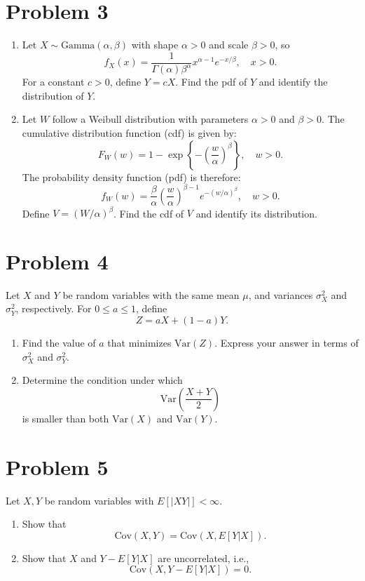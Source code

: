 \documentclass{article}
\begin{document}
\section*{Problem 3}
\begin{enumerate}
    \item Let $X \sim \text{Gamma}(\alpha, \beta)$ with shape $\alpha > 0$ and scale $\beta > 0$, so
    \[
    f_X(x) = \frac{1}{\Gamma(\alpha)\beta^{\alpha}} x^{\alpha-1} e^{-x/\beta}, \quad x > 0.
    \]
    For a constant $c > 0$, define $Y = cX$. Find the pdf of $Y$ and identify the distribution of $Y$.

    \item Let $W$ follow a Weibull distribution with parameters $\alpha > 0$ and $\beta > 0$.
    The cumulative distribution function (cdf) is given by:
    \[
    F_W(w) = 1 - \exp\left\{-\left(\frac{w}{\alpha}\right)^\beta\right\}, \quad w > 0.
    \]
    The probability density function (pdf) is therefore:
    \[
    f_W(w) = \frac{\beta}{\alpha} \left( \frac{w}{\alpha} \right)^{\beta-1} e^{-(w/\alpha)^\beta}, \quad w > 0.
    \]
    Define $V = (W/\alpha)^\beta$. Find the cdf of $V$ and identify its distribution.
\end{enumerate}

\section*{Problem 4}
Let $X$ and $Y$ be random variables with the same mean $\mu$, and variances $\sigma_X^2$ and $\sigma_Y^2$, respectively. For $0 \le a \le 1$, define
\[
Z = aX + (1-a)Y.
\]

\begin{enumerate}
    \item Find the value of $a$ that minimizes $\text{Var}(Z)$. Express your answer in terms of $\sigma_X^2$ and $\sigma_Y^2$.
    \item Determine the condition under which
    \[
    \text{Var}\left(\frac{X+Y}{2}\right)
    \]
    is smaller than both $\text{Var}(X)$ and $\text{Var}(Y)$.
\end{enumerate}

\section*{Problem 5}
Let $X, Y$ be random variables with $E[|XY|] < \infty$.

\begin{enumerate}
    \item Show that
    \[
    \text{Cov}(X, Y) = \text{Cov}(X, E[Y|X]).
    \]
    \item Show that $X$ and $Y - E[Y|X]$ are uncorrelated, i.e.,
    \[
    \text{Cov}(X, Y - E[Y|X]) = 0.
    \]
\end{enumerate}
\end{document}
